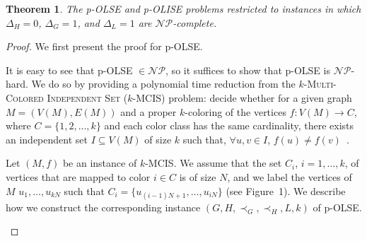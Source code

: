 \documentclass[11pt]{article}
\newtheorem{theorem}{Theorem}[section]
\newcommand{\NP}{\mbox{$\mathcal{NP}$}}
\begin{document}
\begin{theorem}
The p-OLSE and p-OLISE problems restricted to instances in which $\Delta_H =0$, $\Delta_G = 1$, and $\Delta_L = 1$ are $\NP$-complete.
\end{theorem}

\begin{proof}
We first present the proof for p-OLSE.

It is easy to see that p-\textsc{OLSE} $\in \NP$, so it suffices to show that
p-\textsc{OLSE} is $\NP$-hard.  We do so by providing a polynomial time
reduction from the \textsc{$k$-Multi-Colored Independent Set ($k$-MCIS)} problem:
decide whether for a given graph $M = (V(M),E(M))$ and a proper $k$-coloring of the
vertices $f : V(M) \longrightarrow C$, where $C = \{1,2,..., k\}$ and each color class has the same cardinality, there exists an independent
set $I \subseteq V(M)$ of size $k$ such that, $\forall u, v \in I$, $f(u) \ne f(v)$~\cite{Hartung2013}.

Let $(M, f)$ be an instance of \textsc{$k$-MCIS}.
We assume that the set $C_i$, $i=1, \ldots, k$, of vertices that are mapped to color $i \in C$
is of size $N$, and we label the vertices of $M$ $u_1, \dots, u_{kN}$ such that
$C_i = \{u_{(i-1)N + 1}, \dots, u_{iN}\}$ (see Figure~1). We
describe how we construct the corresponding instance $(G, H, \prec_G,
\prec_H, L, k)$ of p-\textsc{OLSE}.

\begin{figure}
\label{fi:kMCIS}
\begin{center}
\end{center}
\end{figure}
\end{proof}
\end{document}
